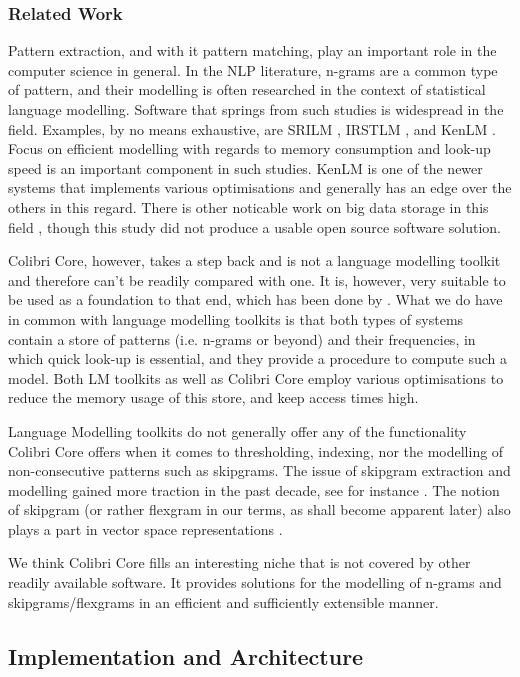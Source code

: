 \documentclass[a4paper,12pt]{article}
\begin{document}
\subsubsection{Related Work}

Pattern extraction, and with it pattern matching, play an important role in the
computer science in general. In the NLP literature, n-grams are a common type
of pattern, and their modelling is often researched in the context of
statistical language modelling.  Software that springs from such studies is
widespread in the field. Examples, by no means exhaustive, are SRILM
\cite{SRILM}, IRSTLM \cite{IRSTLM}, and KenLM \cite{KENLM}. Focus on efficient
modelling with regards to memory consumption and look-up speed is an important
component in such studies. KenLM is one of the newer systems that implements
various optimisations and generally has an edge over the others in this regard. There is other
noticable work on big data storage in this field \cite{Guthrie2012}, though this study did not
produce a usable open source software solution. 

Colibri Core, however, takes a step back and is not a language modelling
toolkit and therefore can't be readily compared with one. It is, however, very
suitable to be used as a foundation to that end, which has been done by
\cite{COCOCPYP}. What we do have in common with language modelling toolkits is
that both types of systems contain a store of patterns (i.e. n-grams or beyond)
and their frequencies, in which quick look-up is essential, and they provide a
procedure to compute such a model. Both LM toolkits as well as Colibri Core
employ various optimisations to reduce the memory usage of this store, and keep
access times high. 

Language Modelling toolkits do not generally offer any of the functionality
Colibri Core offers when it comes to thresholding, indexing, nor the modelling of
non-consecutive patterns such as skipgrams. The issue of skipgram extraction
and modelling gained more traction in the past decade, see for instance
\cite{Guthrie06}. The notion of skipgram (or rather flexgram in our terms, as
shall become apparent later) also plays a part in vector space representations
\cite{Mikolov08}.

We think Colibri Core fills an interesting niche that is not covered by other
readily available software. It provides solutions for the modelling of n-grams and 
skipgrams/flexgrams in an efficient and sufficiently extensible manner.

\subsection{Implementation and Architecture}
\end{document}

